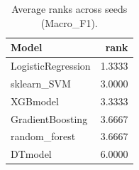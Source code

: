 \begin{table}[t]
\centering
\begin{tabular}{lr}
\toprule
Model & rank \\
\midrule
LogisticRegression & 1.3333 \\
sklearn_SVM & 3.0000 \\
XGBmodel & 3.3333 \\
GradientBoosting & 3.6667 \\
random_forest & 3.6667 \\
DTmodel & 6.0000 \\
\bottomrule
\end{tabular}
\caption{Average ranks across seeds (Macro_F1).}
\label{tab:avg_rank_Macro_F1}
\end{table}